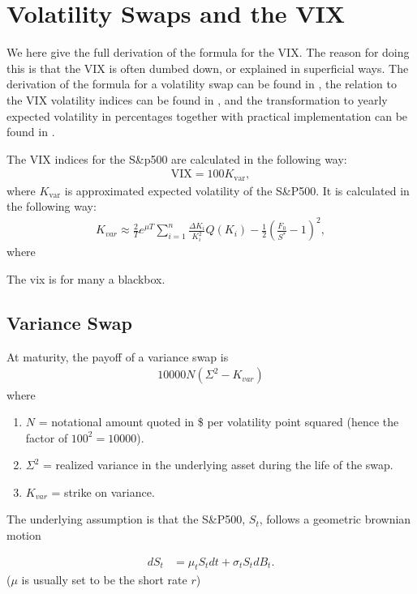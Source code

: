 \chapter{Volatility Swaps and the VIX}
\label{AppendixD}

We here give the full derivation of the formula for the VIX.
The reason for doing this is that the VIX is often dumbed down, or explained in superficial ways.
The derivation of the formula for a volatility swap can be found in \cite{carr1998towards},
the relation to the VIX volatility indices can be found in \cite{carr2005tale},
and the transformation to yearly expected volatility in percentages together with practical implementation can be found in \cite{exchange2009cboe}.

The VIX indices for the S\&p500 are calculated in the following way:
\begin{align}
	\text{VIX} = 100 K_{\text{var}},
\end{align}
where $K_{\text{var}}$ is approximated expected volatility of the S\&P500.
It is calculated in the following way:
\begin{align}
	K_{var}\approx\frac{2}{T}e^{\mu T}\sum_{i=1}^{n}\frac{\Delta K_i}{K_i^2}Q(K_i)-\frac{1}{2}\left(\frac{F_0}{S^*}-1\right)^2,
\end{align}
where 


The vix is for many a blackbox.

\section{Variance Swap}
At maturity, the payoff of a variance swap is
\begin{align*}
10000N(\Sigma^2-K_{var})
\end{align*}
where 
\begin{enumerate}
	\item $N$ = notational amount quoted in \$ per volatility point squared (hence the factor of $100^2=10000$).
	\item $\Sigma^2$ = realized variance in the underlying asset during the life of the swap.
	\item $K_{var}$ = strike on variance.
\end{enumerate}

The underlying assumption is that the S\&P500, $S_t$, follows a geometric brownian motion

\begin{align*}
dS_t&=\mu_tS_tdt+\sigma_tS_tdB_t.
\end{align*}
($\mu$ is usually set to be the short rate $r$)

